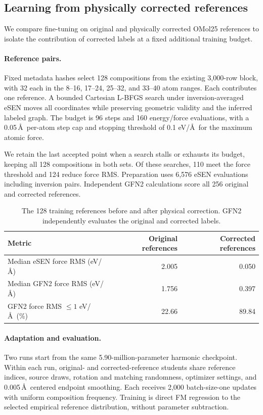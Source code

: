 \subsection{Learning from physically corrected references}\label{app:broad-physical-targets}
We compare fine-tuning on original and physically corrected OMol25 references to isolate the contribution of corrected labels at a fixed additional training budget.

\paragraph{Reference pairs.}
Fixed metadata hashes select 128 compositions from the existing 3,000-row block, with 32 each in the 8--16, 17--24, 25--32, and 33--40 atom ranges. Each contributes one reference. A bounded Cartesian L-BFGS search under inversion-averaged eSEN moves all coordinates while preserving geometric validity and the inferred labeled graph. The budget is 96 steps and 160 energy/force evaluations, with a 0.05\,\AA\ per-atom step cap and stopping threshold of 0.1 eV/\AA\ for the maximum atomic force.

We retain the last accepted point when a search stalls or exhausts its budget, keeping all 128 compositions in both sets. Of these searches, 110 meet the force threshold and 124 reduce force RMS. Preparation uses 6,576 eSEN evaluations including inversion pairs. Independent GFN2 calculations score all 256 original and corrected references.

\begin{table}[htbp]
\centering
\caption{The 128 training references before and after physical correction. GFN2 independently evaluates the original and corrected labels.}
\small
\begin{tabular}{lrr}
\toprule
Metric & Original references & Corrected references\\
\midrule
Median eSEN force RMS (eV/\AA) &2.005&0.050\\
Median GFN2 force RMS (eV/\AA) &1.756&0.397\\
GFN2 force RMS $\leq1$ eV/\AA\ (\%) &22.66&89.84\\
\bottomrule
\end{tabular}
\end{table}

\paragraph{Adaptation and evaluation.}
Two runs start from the same 5.90-million-parameter harmonic checkpoint. Within each run, original- and corrected-reference students share reference indices, source draws, rotation and matching randomness, optimizer settings, and 0.005\,\AA\ centered endpoint smoothing. Each receives 2,000 batch-size-one updates with uniform composition frequency. Training is direct FM regression to the selected empirical reference distribution, without parameter subtraction.

